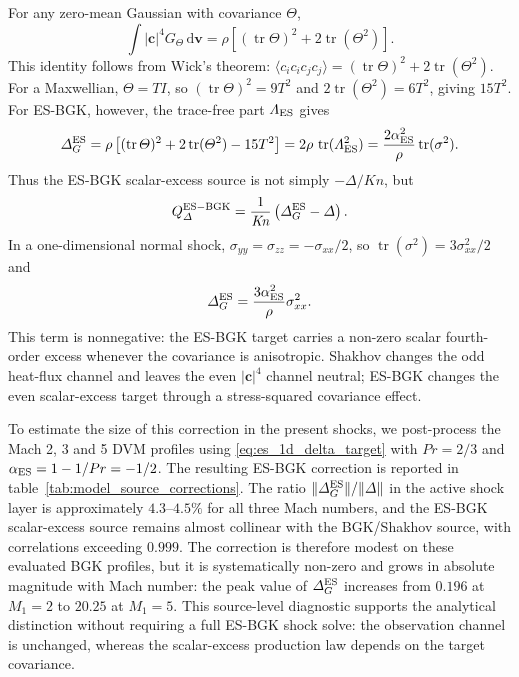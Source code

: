 \documentclass[lineno,paper]{JFM-FLM_Au}
\newenvironment{revision}{\begingroup\colorlet{shadecolor}{revisionyellow}\begin{shaded}}{\end{shaded}\endgroup}
\newenvironment{revision}{}{}
\newcommand{\Kn}{\mathit{Kn}}
\newcommand{\dd}{\mathrm{d}}
\newcommand{\tr}{\operatorname{tr}}
\begin{document}
\begin{revision}
For any zero-mean Gaussian with covariance $\Theta$,
\begin{equation}
  \int |\boldsymbol c|^4G_\Theta\,\dd\boldsymbol v
  =\rho\left[(\tr\Theta)^2+2\tr(\Theta^2)\right].
  \label{eq:es_fourth}
\end{equation}
This identity follows from Wick's theorem: $\langle c_i c_i c_j c_j\rangle=(\tr\Theta)^2+2\tr(\Theta^2)$.  For a Maxwellian, $\Theta=T I$, so $(\tr\Theta)^2=9T^2$ and $2\tr(\Theta^2)=6T^2$, giving $15T^2$.  For ES-BGK, however, the trace-free part $\Lambda_{\rm ES}$ gives
\begin{equation}
  \Delta_G^{\rm ES}
  =\rho\left[(\tr\Theta)^2+2\tr(\Theta^2)-15T^2\right]
  =2\rho\,\tr(\Lambda_{\rm ES}^2)
  =\frac{2\alpha_{\rm ES}^2}{\rho}\tr(\sigma^2).
  \label{eq:es_delta_target}
\end{equation}
Thus the ES-BGK scalar-excess source is not simply $-\Delta/\Kn$, but
\begin{equation}
  Q_\Delta^{\rm ES-BGK}
  =\frac{1}{\Kn}\left(\Delta_G^{\rm ES}-\Delta\right) .
  \label{eq:es_delta_source}
\end{equation}
In a one-dimensional normal shock, $\sigma_{yy}=\sigma_{zz}=-\sigma_{xx}/2$, so $\tr(\sigma^2)=3\sigma_{xx}^2/2$ and
\begin{equation}
  \Delta_G^{\rm ES}=\frac{3\alpha_{\rm ES}^2}{\rho}\sigma_{xx}^2 .
  \label{eq:es_1d_delta_target}
\end{equation}
This term is nonnegative: the ES-BGK target carries a non-zero scalar fourth-order excess whenever the covariance is anisotropic.  Shakhov changes the odd heat-flux channel and leaves the even $|\boldsymbol c|^4$ channel neutral; ES-BGK changes the even scalar-excess target through a stress-squared covariance effect.
\end{revision}


To estimate the size of this correction in the present shocks, we post-process the Mach 2, 3 and 5 DVM profiles using \eqref{eq:es_1d_delta_target} with $Pr=2/3$ and $\alpha_{\rm ES}=1-1/Pr=-1/2$.  The resulting ES-BGK correction is reported in table~\ref{tab:model_source_corrections}.  The ratio $\|\Delta_G^{\rm ES}\|/\|\Delta\|$ in the active shock layer is approximately $4.3$--$4.5\%$ for all three Mach numbers, and the ES-BGK scalar-excess source remains almost collinear with the BGK/Shakhov source, with correlations exceeding $0.999$.  The correction is therefore modest on these evaluated BGK profiles, but it is systematically non-zero and grows in absolute magnitude with Mach number: the peak value of $\Delta_G^{\rm ES}$ increases from $0.196$ at $M_1=2$ to $20.25$ at $M_1=5$.  This source-level diagnostic supports the analytical distinction without requiring a full ES-BGK shock solve: the observation channel is unchanged, whereas the scalar-excess production law depends on the target covariance.
\end{document}
